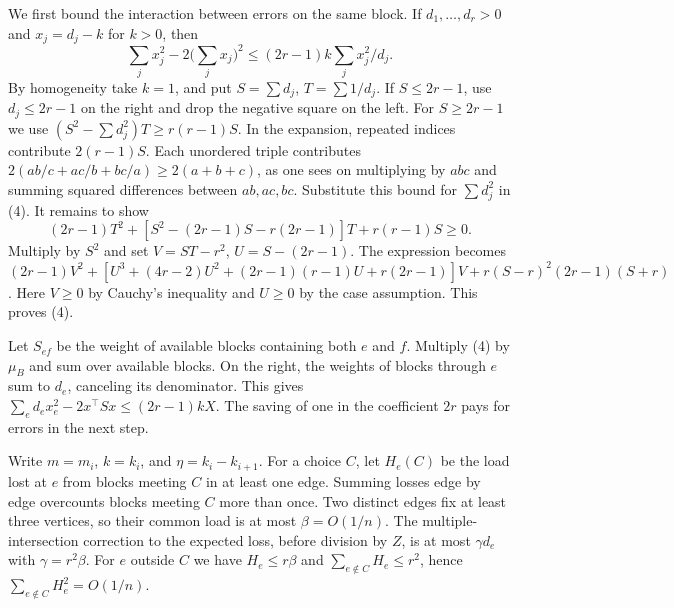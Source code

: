 \documentclass[english,11pt,a4paper]{article}
\begin{document}
We first bound the interaction between errors on the same block. If \(d_1,\ldots,d_r>0\) and \(x_j=d_j-k\) for \(k>0\), then \[\sum_j x_j^2-2\Big(\sum_j x_j\Big)^2
       \le (2r-1)k\sum_j x_j^2/d_j . \tag{4}\] By homogeneity take \(k=1\), and put \(S=\sum d_j\), \(T=\sum 1/d_j\). If \(S\le2r-1\), use \(d_j\le2r-1\) on the right and drop the negative square on the left. For \(S\ge2r-1\) we use \((S^2-\sum d_j^2)T\ge r(r-1)S\). In the expansion, repeated indices contribute \(2(r-1)S\). Each unordered triple contributes \(2(ab/c+ac/b+bc/a)\ge2(a+b+c)\), as one sees on multiplying by \(abc\) and summing squared differences between \(ab,ac,bc\). Substitute this bound for \(\sum d_j^2\) in (4). It remains to show \[(2r-1)T^2+[S^2-(2r-1)S-r(2r-1)]T+r(r-1)S\ge0.\] Multiply by \(S^2\) and set \(V=ST-r^2\), \(U=S-(2r-1)\). The expression becomes \((2r-1)V^2+[U^3+(4r-2)U^2+(2r-1)(r-1)U+r(2r-1)]V+r(S-r)^2(2r-1)(S+r)\). Here \(V\ge0\) by Cauchy's inequality and \(U\ge0\) by the case assumption. This proves (4).

Let \(S_{ef}\) be the weight of available blocks containing both \(e\) and \(f\). Multiply (4) by \(\mu_B\) and sum over available blocks. On the right, the weights of blocks through \(e\) sum to \(d_e\), canceling its denominator. This gives \(\sum_e d_ex_e^2-2x^\top Sx\le(2r-1)kX\). The saving of one in the coefficient \(2r\) pays for errors in the next step.

Write \(m=m_i\), \(k=k_i\), and \(\eta=k_i-k_{i+1}\). For a choice \(C\), let \(H_e(C)\) be the load lost at \(e\) from blocks meeting \(C\) in at least one edge. Summing losses edge by edge overcounts blocks meeting \(C\) more than once. Two distinct edges fix at least three vertices, so their common load is at most \(\beta=O(1/n)\). The multiple-intersection correction to the expected loss, before division by \(Z\), is at most \(\gamma d_e\) with \(\gamma=r^2\beta\). For \(e\) outside \(C\) we have \(H_e\le r\beta\) and \(\sum_{e\notin C}H_e\le r^2\), hence \(\sum_{e\notin C}H_e^2=O(1/n)\).
\end{document}
